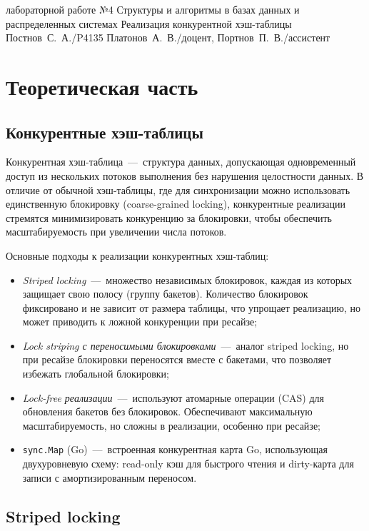 \documentclass{itmo}
\begin{document}
\makereporttitle{}
	{лабораторной работе №4}
	{Структуры и алгоритмы в базах данных и распределенных системах}
	{Реализация конкурентной хэш-таблицы}
	{}
	{Постнов~С.~А./P4135}
	{Платонов~А.~В./доцент, Портнов~П.~В./ассистент}

\maketableofcontents

\chapter{Теоретическая часть}

\section{Конкурентные хэш-таблицы}

Конкурентная хэш-таблица~---~структура данных, допускающая одновременный доступ из нескольких потоков выполнения без нарушения целостности данных.
В отличие от обычной хэш-таблицы, где для синхронизации можно использовать единственную блокировку (coarse-grained locking), конкурентные реализации стремятся минимизировать конкуренцию за блокировки, чтобы обеспечить масштабируемость при увеличении числа потоков.

Основные подходы к реализации конкурентных хэш-таблиц:
\begin{itemize}
	\item \textit{Striped locking}~---~множество независимых блокировок, каждая из которых защищает свою полосу (группу бакетов).
	Количество блокировок фиксировано и не зависит от размера таблицы, что упрощает реализацию, но может приводить к ложной конкуренции при ресайзе;
	\item \textit{Lock striping с переносимыми блокировками}~---~аналог striped locking, но при ресайзе блокировки переносятся вместе с бакетами, что позволяет избежать глобальной блокировки;
	\item \textit{Lock-free реализации}~---~используют атомарные операции (CAS) для обновления бакетов без блокировок.
	Обеспечивают максимальную масштабируемость, но сложны в реализации, особенно при ресайзе;
	\item \texttt{sync.Map} (Go)~---~встроенная конкурентная карта Go, использующая двухуровневую схему: read-only кэш для быстрого чтения и dirty-карта для записи с амортизированным переносом.
\end{itemize}

\section{Striped locking}
\end{document}
